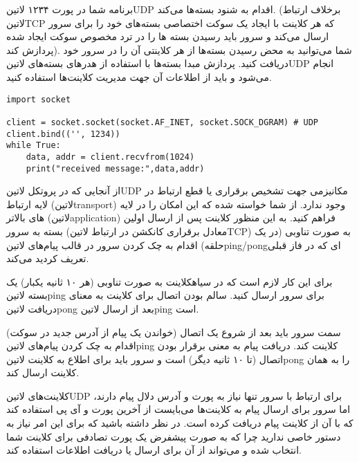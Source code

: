 \documentclass[]{article}
\begin{document}
  برنامه شما در پورت ۱۲۳۴ ‌لاتین{UDP} اقدام به شنود بسته‌ها می‌کند.
  (برخلاف ارتباط ‌لاتین{TCP} که هر کلاینت با ایجاد یک سوکت اختصاصی بسته‌های خود را برای سرور ارسال می‌کند و سرور باید رسیدن بسته ها را در ترد مخصوص سوکت ایجاد شده پردازش کند).
  شما می‌توانید به محض رسیدن بسته‌ها از هر کلاینتی آن را در سرور خود دریافت کنید.
  پردازش مبدا بسته‌ها با استفاده از هدرهای بسته‌های ‌لاتین{UDP} انجام می‌شود و باید از اطلاعات آن جهت مدیریت کلاینت‌ها استفاده کنید.

  \begin{latin}
  \begin{verbatim}
import socket

client = socket.socket(socket.AF_INET, socket.SOCK_DGRAM) # UDP
client.bind(('', 1234))
while True:
    data, addr = client.recvfrom(1024)
    print("received message:",data,addr)
  \end{verbatim}
  \end{latin}


  از آنجایی که در پروتکل ‌لاتین{UDP} مکانیزمی جهت تشخیص برقراری یا قطع ارتباط در لایه ارتباط (‌لاتین{transport}) وجود ندارد.
  از شما خواسته شده که این امکان را در لایه های بالاتر (‌لاتین{application}) فراهم کنید.
  به این منظور کلاینت پس از ارسال اولین بسته به سرور (معادل برقراری کانکشن در ارتباط ‌لاتین{TCP})
  به صورت تناوبی (در یک حلقه) اقدام به چک کردن سرور در قالب پیام‌های ‌لاتین{ping/pong}ای که در فاز قبلی تعریف کردید می‌کند.

  برای این کار لازم است که در ‌سیاه{کلاینت} به صورت تناوبی (هر ۱۰ ثانیه یکبار) یک بسته ‌لاتین{ping} برای سرور ارسال کنید.
  سالم بودن اتصال برای کلاینت به معنای دریافت ‌لاتین{pong} بعد از ارسال ‌لاتین{ping} است.

  سمت سرور باید بعد از شروع یک اتصال (خواندن یک پیام از آدرس جدید در سوکت) اقدام به چک کردن پیام‌های ‌لاتین{ping} کلاینت کند.
  دریافت پیام به معنی برقرار بودن اتصال (تا ۱۰ ثانیه دیگر) است و سرور باید برای اطلاع به کلاینت ‌لاتین{pong} را به همان کلاینت ارسال کند.


  کلاینت‌های ‌لاتین{UDP} برای ارتباط با سرور تنها نیاز به پورت و آدرس دلال پیام دارند، اما سرور برای ارسال پیام به کلاینت‌ها
  می‌بایست از آخرین پورت و آی پی استفاده کند که با آن از کلاینت پیام دریافت کرده است. در نظر داشته باشید که برای این امر
  نیاز به دستور خاصی ندارید چرا که به صورت پیشفرض یک پورت تصادفی برای کلاینت شما انتخاب شده و می‌تواند از آن برای ارسال
  یا دریافت اطلاعات استفاده کند.
\end{document}
